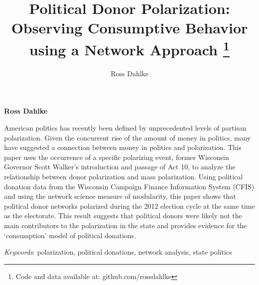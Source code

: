 \documentclass[12pt,]{article}
\title{Political Donor Polarization: Observing Consumptive Behavior using a
Network Approach \thanks{Code and data available at: github.com/rossdahlke}  }
\author{\Large Ross Dahlke\vspace{0.05in} \newline\normalsize\emph{}  }
\date{}
\newcommand*{\authorfont}{\fontfamily{phv}\selectfont}
\renewenvironment{abstract}
 {{%
    \setlength{\leftmargin}{0mm}
    \setlength{\rightmargin}{\leftmargin}%
  }%
  \relax}
 {\endlist}
\begin{document}
	
%

{%
\setlength{\parindent}{0pt}
\thispagestyle{plain}
{\fontsize{18}{20}\selectfont\raggedright 
\maketitle  %

}

{
   \vskip 13.5pt\relax \normalsize\fontsize{11}{12} 
\textbf{\authorfont Ross Dahlke} \hskip 15pt \emph{\small }   

}

}








\begin{abstract}

    \hbox{\vrule height .2pt width 39.14pc}

    \vskip 8.5pt %

\noindent American politics has recently been defined by unprecedented levels of
partisan polarization. Given the concurrent rise of the amount of money
in politics, many have suggested a connection between money in politics
and polarization. This paper uses the occurrence of a specific
polarizing event, former Wisconsin Governor Scott Walker's introduction
and passage of Act 10, to analyze the relationship between donor
polarization and mass polarization. Using political donation data from
the Wisconsin Campaign Finance Information System (CFIS) and using the
network science measure of modularity, this paper shows that political
donor networks polarized during the 2012 election cycle at the same time
as the electorate. This result suggests that political donors were
likely not the main contributors to the polarization in the state and
provides evidence for the `consumption' model of political donations.


\vskip 8.5pt \noindent \emph{Keywords}: polarization, political donations, network analysis, state politics \par

    \hbox{\vrule height .2pt width 39.14pc}



\end{abstract}
\end{document}

